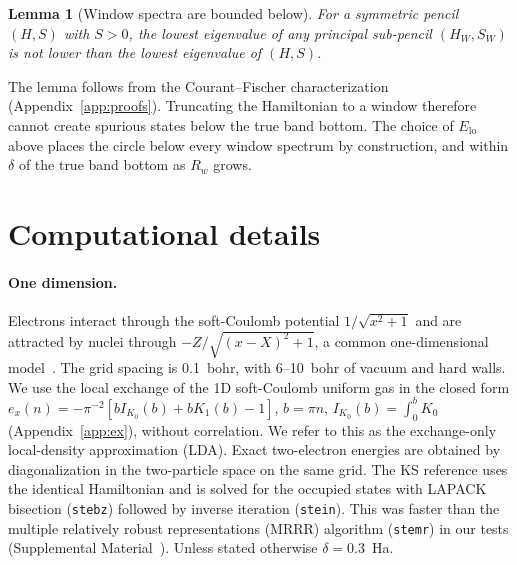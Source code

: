 \documentclass[aps,prb,twocolumn,superscriptaddress,floatfix,longbibliography]{revtex4-2}
\newtheorem{lemma}{Lemma}
\theoremstyle{remark}
\newcommand{\SM}{Supplemental Material~\cite{SM}}
\begin{document}
\begin{lemma}[Window spectra are bounded below]\label{lem:interlace}
For a symmetric pencil $(H,S)$ with $S>0$, the lowest eigenvalue of any principal sub-pencil $(H_W,S_W)$ is not lower than
the lowest eigenvalue of $(H,S)$.
\end{lemma}

The lemma follows from the Courant--Fischer characterization (Appendix~\ref{app:proofs}). Truncating the Hamiltonian
to a window therefore cannot create spurious states below the true band bottom. The choice of $E_\mathrm{lo}$ above places
the circle below every window spectrum by construction, and within $\delta$ of the true band bottom as $R_w$ grows.

\section{Computational details}\label{sec:details}

\paragraph*{One dimension.} Electrons interact through the soft-Coulomb potential $1/\sqrt{x^2+1}$ and are attracted by
nuclei through $-Z/\sqrt{(x-X)^2+1}$, a common one-dimensional model~\cite{Helbig2011}. The grid spacing is 0.1~bohr, with
6--10~bohr of vacuum and hard walls. We use the local exchange of the 1D soft-Coulomb uniform gas in the closed form
$e_x(n)=-\pi^{-2}[bI_{K_0}(b)+bK_1(b)-1]$, $b=\pi n$, $I_{K_0}(b)=\int_0^bK_0$ (Appendix~\ref{app:ex}), without correlation.
We refer to this as the exchange-only local-density approximation (LDA). Exact two-electron energies are obtained by diagonalization in the two-particle
space on the same grid. The KS reference uses the identical Hamiltonian and is solved for the occupied states with LAPACK
bisection (\texttt{stebz}) followed by inverse iteration (\texttt{stein}). This was faster than the multiple relatively robust
representations (MRRR) algorithm (\texttt{stemr}) in our tests (\SM). Unless stated otherwise $\delta=0.3$~Ha.
\end{document}
